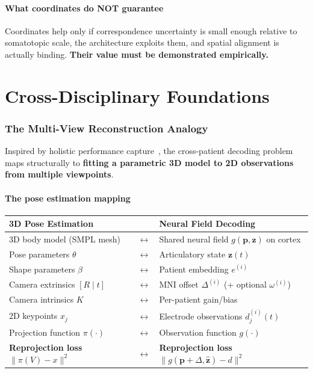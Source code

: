 \documentclass[11pt,letterpaper]{article}
\newcommand{\bfp}{\mathbf{p}}
\newcommand{\bfz}{\mathbf{z}}
\begin{document}
\subsection{What coordinates do NOT guarantee}

Coordinates help only if correspondence uncertainty is small enough relative to somatotopic scale, the architecture exploits them, and spatial alignment is actually binding. \textbf{Their value must be demonstrated empirically.}



\part{Cross-Disciplinary Foundations}

\section{The Multi-View Reconstruction Analogy}\label{sec:analogy}

Inspired by holistic performance capture~\cite{hewitt2024}, the cross-patient decoding problem maps structurally to \textbf{fitting a parametric 3D model to 2D observations from multiple viewpoints}.

\subsection{The pose estimation mapping}

\begin{table}[ht!]\centering\small
\begin{tabular}{@{}p{}c p{}@{}}
\toprule
\textbf{3D Pose Estimation} & & \textbf{Neural Field Decoding} \\
\midrule
3D body model (SMPL mesh) & $\leftrightarrow$ & Shared neural field $g(\bfp, \bfz)$ on cortex \\[3pt]
Pose parameters $\theta$ & $\leftrightarrow$ & Articulatory state $\bfz(t)$ \\[3pt]
Shape parameters $\beta$ & $\leftrightarrow$ & Patient embedding $e^{(i)}$ \\[3pt]
Camera extrinsics $[R \mid t]$ & $\leftrightarrow$ & MNI offset $\Delta^{(i)}$ (+ optional $\omega^{(i)}$) \\[3pt]
Camera intrinsics $K$ & $\leftrightarrow$ & Per-patient gain/bias \\[3pt]
2D keypoints $x_j$ & $\leftrightarrow$ & Electrode observations $d_j^{(i)}(t)$ \\[3pt]
Projection function $\pi(\cdot)$ & $\leftrightarrow$ & Observation function $g(\cdot)$ \\[3pt]
\textbf{Reprojection loss} $\|\pi(V) - x\|^2$ & $\leftrightarrow$ & \textbf{Reprojection loss} $\|g(\bfp{+}\Delta, \hat{\bfz}) - d\|^2$ \\
\bottomrule
\end{tabular}
\end{table}
\end{document}
